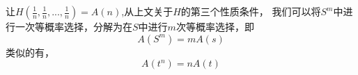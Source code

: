 让$H(\frac{1}{n},\frac{1}{n},...,\frac{1}{n})=A(n)$,从上文关于$H$的第三个性质条件，
我们可以将$S^m$中进行一次等概率选择，分解为在$S$中进行$m$次等概率选择，即
\begin{equation}
A(S^m)=mA(s)
\end{equation}
类似的有，
\begin{equation}
A(t^n)=nA(t)
\end{equation}


